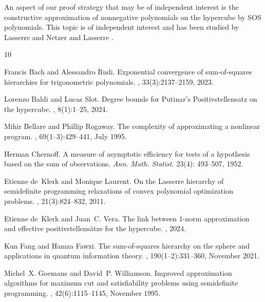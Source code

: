 \documentclass[11pt]{article}
\theoremstyle{definition}
\begin{document}
An aspect of our proof strategy that may be of independent interest is the constructive approximation of nonnegative polynomials on the hypercube by SOS polynomials. This topic is of independent interest and has been studied by Lasserre and Netzer \cite{Lasserre_Netzer} and Lasserre \cite{doi:10.1137/04061413X}.


%

\begin{thebibliography}{10}

Francis Bach and Alessandro Rudi.
\newblock Exponential convergence of sum-of-squares hierarchies for
  trigonometric polynomials.
, 33(3):2137--2159, 2023.

Lorenzo Baldi and Lucas Slot.
\newblock Degree bounds for {P}utinar’s {P}ositivstellensatz on the
  hypercube.
, 8(1):1--25, 2024.

Mihir Bellare and Phillip Rogaway.
\newblock The complexity of approximating a nonlinear program.
, 69(1–3):429--441, July 1995.

{
Herman Chernoff. \newblock A measure of asymptotic efficiency for tests of a hypothesis based on the sum of observations.
\newblock  \emph{Ann. Math. Statist.} 23(4): 493--507,  1952.
}


Etienne de~Klerk and Monique Laurent.
\newblock On the {L}asserre hierarchy of semidefinite programming relaxations
  of convex polynomial optimization problems.
, 21(3):824--832, 2011.

Etienne de~Klerk and Juan~C. Vera.
\newblock The link between $ 1 $-norm approximation and effective
  positivstellensätze for the hypercube.
, 2024.

Kun Fang and Hamza Fawzi.
\newblock The sum-of-squares hierarchy on the sphere and applications in
  quantum information theory.
, 190(1–2):331–360, November 2021.

Michel~X. Goemans and David~P. Williamson.
\newblock Improved approximation algorithms for maximum cut and satisfiability
  problems using semidefinite programming.
, 42(6):1115--1145, November 1995.


\end{thebibliography}
\end{document}
